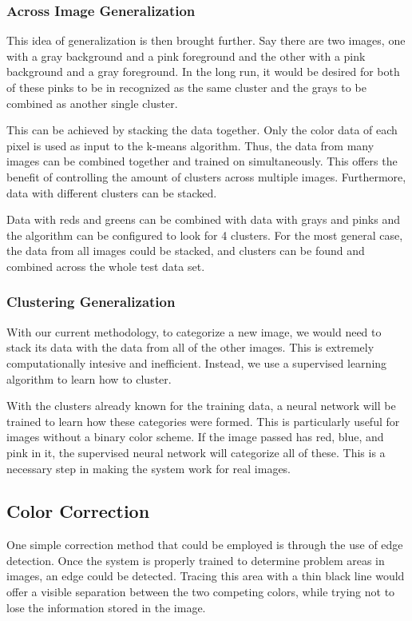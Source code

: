 \documentclass[12pt]{article}
\begin{document}
\subsubsection{Across Image Generalization}
This idea of generalization is then brought further. Say there are two images, one with a gray background and a pink foreground and the other with a pink background and a gray foreground. In the long run, it would be desired for both of these pinks to be in recognized as the same cluster and the grays to be combined as another single cluster. 

This can be achieved by stacking the data together. Only the color data of each pixel is used as input to the k-means algorithm. Thus, the data from many images can be combined together and trained on simultaneously. This offers the benefit of controlling the amount of clusters across multiple images. Furthermore, data with different clusters can be stacked.

Data with reds and greens can be combined with data with grays and pinks and the algorithm can be configured to look for 4 clusters. For the most general case, the data from all images could be stacked, and clusters can be found and combined across the whole test data set.

\subsubsection{Clustering Generalization}
With our current methodology, to categorize a new image, we would need to stack its data with the data from all of the other images. This is extremely computationally intesive and inefficient. Instead, we use a supervised learning algorithm to learn how to cluster.

With the clusters already known for the training data, a neural network will be trained to learn how these categories were formed. This is particularly useful for images without a binary color scheme. If the image passed has red, blue, and pink in it, the supervised neural network will categorize all of these. This is a necessary step in making the system work for real images.



\subsection{Color Correction}

One simple correction method that could be employed is through the use of edge detection. Once the system is properly trained to determine problem areas in images, an edge could be detected. Tracing this area with a thin black line would offer a visible separation between the two competing colors, while trying not to lose the information stored in the image.
\end{document}
